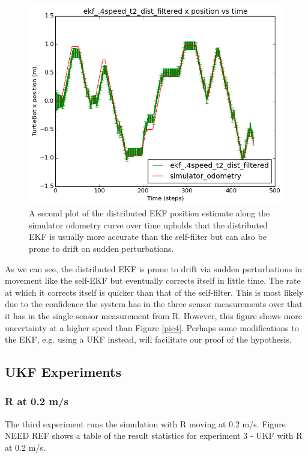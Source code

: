 \documentclass[conference]{IEEEtran} \usepackage[T1]{fontenc} \usepackage[backend=biber, style=ieee]{biblatex}
\begin{document}
\begin{figure}
\centering 
\includegraphics[scale=.45]{ekf_4speed_t2_dist_filtered_pos_err_graph}
\caption {A second plot of the distributed EKF position estimate along the simulator odometry curve over time 
upholds that the distributed EKF is usually more accurate than the self-filter but can also be prone to drift on sudden 
perturbations.}
\label{pic7} 
\end{figure}

As we can see, the distributed EKF is prone to drift via sudden perturbations in movement like the self-EKF but 
eventually corrects itself in little time. The rate at which it corrects itself is quicker than that of the self-filter. 
This is most likely due to the confidence the system has in the three sensor measurements over that it has in the single 
sensor measurement from R. However, this figure shows more uncertainty at a higher speed than Figure \ref{pic4}. Perhaps some 
modifications to the EKF, e.g. using a UKF instead, will facilitate our proof of the hypothesis.

\subsection{UKF Experiments} \label{UKF Experiments}
\subsubsection{R at 0.2 m/s} \label{UKF .2}
The third experiment runs the simulation with R moving at 0.2 m/s. Figure NEED REF shows a table of the result statistics for experiment 3 - UKF 
with R at 0.2 m/s. 
\end{document}

